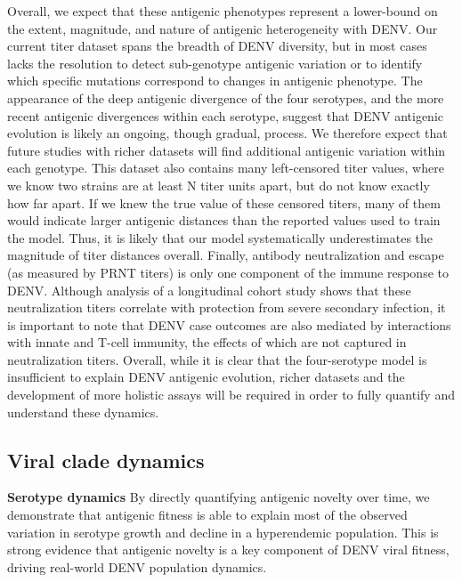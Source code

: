\documentclass[11pt,oneside,letterpaper]{article}
\def\tbc#1{\textcolor{purple}{[#1]}}
\begin{document}
Overall, we expect that these antigenic phenotypes represent a lower-bound on the extent, magnitude, and nature of antigenic heterogeneity with DENV.
Our current titer dataset spans the breadth of DENV diversity, but in most cases lacks the resolution to detect sub-genotype antigenic variation or to identify which specific mutations correspond to changes in antigenic phenotype.
The appearance of the deep antigenic divergence of the four serotypes, and the more recent antigenic divergences within each serotype, suggest that DENV antigenic evolution is likely an ongoing, though gradual, process.
We therefore expect that future studies with richer datasets will find additional antigenic variation within each genotype.
This dataset also contains many left-censored titer values, where we know two strains are at least N titer units apart, but do not know exactly how far apart.
If we knew the true value of these censored titers, many of them would indicate larger antigenic distances than the reported values used to train the model.
Thus, it is likely that our model systematically underestimates the magnitude of titer distances overall.
Finally, antibody neutralization and escape (as measured by PRNT titers) is only one component of the immune response to DENV.
Although analysis of a longitudinal cohort study shows that these neutralization titers correlate with protection from severe secondary infection, it is important to note that
DENV case outcomes are also mediated by interactions with innate and T-cell immunity, the effects of which are not captured in neutralization titers.
Overall, while it is clear that the four-serotype model is insufficient to explain DENV antigenic evolution, richer datasets and the development of more holistic assays will be required in order to fully quantify and understand these dynamics.

\subsection*{Viral clade dynamics}
\textbf{Serotype dynamics}
By directly quantifying antigenic novelty over time, we demonstrate that antigenic fitness is able to explain most of the observed variation in serotype growth and decline in a hyperendemic population.
This is strong evidence that antigenic novelty is a key component of DENV viral fitness, driving real-world DENV population dynamics.
\end{document}
